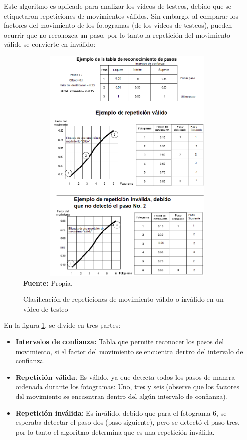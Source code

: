 Este algoritmo es aplicado para analizar los v\'ideos de testeos, debido que se etiquetaron  repeticiones de movimientos v\'alidos.  Sin embargo, al comparar los factores del movimiento de los fotogramas (de los v\'ideos de testeos), pueden ocurrir que no reconozca un paso, por lo tanto la repetici\'on del movimiento v\'alido se convierte en inv\'alido:
 \begin{figure}[H]
	\caption{Clasificaci\'on de repeticiones de movimiento v\'alido o inv\'alido  en un v\'ideo de testeo}
	\label{fig:detValido}
	\centering
	\includegraphics[width=430px,height=450px]{graphics/reconocimientoDePasos.png} \\
	\textbf{Fuente:} Propia.
\end{figure}
En la figura \ref{fig:detValido}, se divide en tres partes:
\begin{itemize}
\item \textbf{Intervalos de confianza:} Tabla que permite reconocer los pasos del movimiento, si el factor del movimiento se encuentra dentro del intervalo de confianza.
\item \textbf{Repetici\'on v\'alida:} Es v\'alido,  ya que detecta todos los pasos de manera ordenada  durante los fotogramas: Uno, tres y seis (observe que los factores del movimiento se encuentran dentro del alg\'un intervalo de confianza). 
\item \textbf{Repetici\'on inv\'alida:} Es inv\'alido, debido que para el fotograma 6, se esperaba detectar el paso dos (paso siguiente), pero se detect\'o el paso tres, por lo tanto el algoritmo determina que es una repetici\'on inv\'alida.
\end{itemize}
